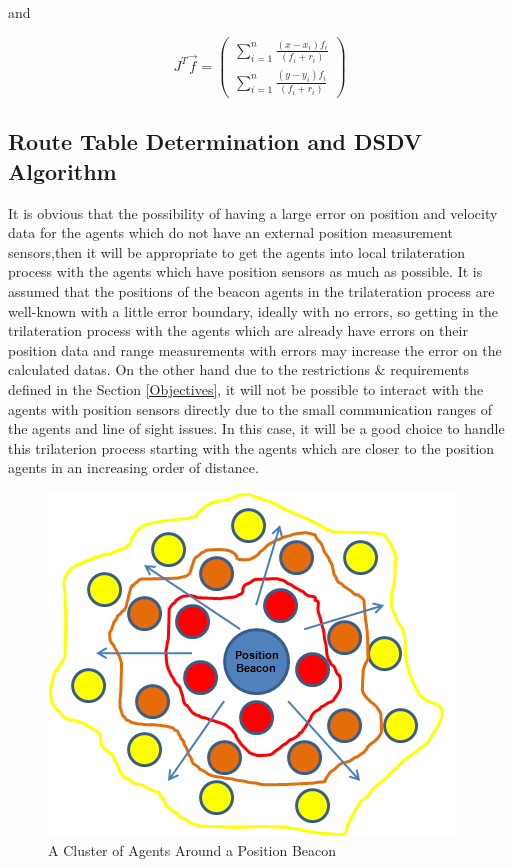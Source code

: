 and 

\begin{equation}
J^T\vec{f} = \left(\begin{matrix}
\sum_{i=1}^{n}\frac{(x-x_i)f_i}{(f_i+r_i)} \\
\sum_{i=1}^{n}\frac{(y-y_i)f_i}{(f_i+r_i)}
\end{matrix}\right)
\end{equation}
	
	
\subsection{ Route Table Determination and  DSDV Algorithm}
It is obvious that the possibility of having a large error on position and velocity data for the agents which do not have an external position measurement sensors,then it will be appropriate to get the agents into local trilateration process with the agents which have position sensors as much as possible. It is assumed that the positions of the beacon agents in the trilateration process are well-known with a little error boundary, ideally with no errors, so getting in the trilateration process with the agents which are already have errors on their position data and range measurements with errors may increase the error on the calculated datas. On the other hand due to the restrictions $\&$ requirements defined in the Section \ref{Objectives}, it will not be possible to interact with the agents with position sensors directly due to the small communication ranges of the agents and line of sight issues. In this case, it will be a good choice to handle this trilaterion process starting with the agents which are closer to the position agents in an increasing order of distance.

\begin{figure}[H] 
\caption{A Cluster of Agents Around a Position Beacon} \label{position_beacon}
\centering
\includegraphics[scale = 0.65]{position_beacon}
\end{figure}

